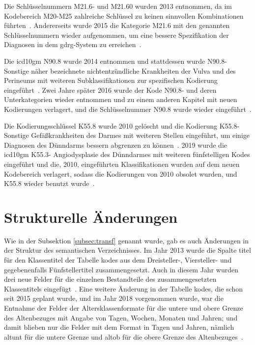 Die Schlüsselnummern \textsf{M21.6-} und \textsf{M21.60} wurden 2013 entnommen, da im Kodebereich \textsf{M20-M25} zahlreiche Schlüssel zu keinen sinnvollen Kombinationen führten~\cite{dele13}. Andererseits wurde 2015 die Kategorie \textsf{M21.6} mit den genannten Schlüsselnummern wieder aufgenommen, um eine bessere Spezifikation der Diagnosen in dem \ac{gdrg}-System zu erreichen~\cite{komm15}. 

Die \ac{icd10gm} \textsf{N90.8} wurde 2014 entnommen und stattdessen wurde \textsf{N90.8-} \textsf{Sonstige näher bezeichnete nichtentzündliche Krankheiten der Vulva und des Perineums} mit weiteren Subklassifikationen zur spezifischen Kodierung eingeführt~\cite{komm14}. Zwei Jahre später 2016 wurde der Kode \textsf{N90.8-} und deren Unterkategorien wieder entnommen und zu einem anderen Kapitel mit neuen Kodierungen verlagert, und die Schlüsselnummer \textsf{N90.8} wurde wieder eingeführt~\cite{komm16}.

Die Kodierungsschlüssel \textsf{K55.8} wurde 2010 gelöscht und die Kodierung \textsf{K55.8-} \textsf{Sonstige Gefäßkrankheiten des Darmes} mit weiteren Stellen eingeführt, um einige Diagnosen des Dünndarms bessern abgrenzen zu können~\cite{komm10}. 2019 wurde die \ac{icd10gm} \textsf{K55.3-} \textsf{Angiodysplasie des Dünndarmes} mit weiteren fünfstelligen Kodes eingeführt und die, 2010, eingeführten Klassifikationen wurden auf dem neuen Kodebereich verlagert, sodass die Kodierungen von 2010 obsolet wurden, und \textsf{K55.8} wieder benutzt wurde~\cite{komm19}.

\section{Strukturelle Änderungen} \label{sec:strucmodif}

Wie in der Subsektion \ref{subsec:transf} genannt wurde, gab es auch Änderungen in der Struktur des semantischen Verzeichnisses. Im Jahr 2013 wurde die Spalte \glqq\textsf{titel}\grqq{} für den Klassentitel der Tabelle \glqq\textsf{kodes}\grqq{} aus dem Dreisteller-, Viersteller- und gegebenenfalls Fünfstellertitel zusammengesetzt. Auch in diesem Jahr wurden drei neue Felder für die einzelnen Bestandteile des zusammengesetzten Klassentitels eingefügt~\cite{readme13}. Eine weitere Änderung in der Tabelle \glqq\textsf{kodes}\grqq{}, die schon seit 2015 geplant wurde, und im Jahr 2018 vorgenommen wurde, war die Entnahme der Felder der Altersklassenformate für die untere und obere Grenze des Altenbezuges mit Angabe von Tagen, Wochen, Monaten und Jahren; und damit blieben nur die Felder mit dem Format in Tagen und Jahren, nämlich  \glqq\textsf{altunt}\grqq{} für die untere Grenze und \glqq\textsf{altob}\grqq{} für die obere Grenze des Altenbezuges~\cite{readme17}.
